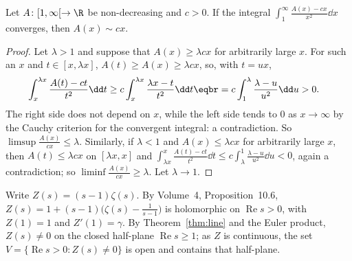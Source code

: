 \begin{lemma}\label{lem:monotone}
Let $A\colon[1,\infty[\to\R$ be non-decreasing and $c>0$. If the integral $\displaystyle\int_1^\infty\frac{A(x)-cx}{x^2}\dd x$ converges, then $A(x)\sim cx$.
\end{lemma}
\begin{proof}
Let $\lambda>1$ and suppose that $A(x)\ge\lambda cx$ for arbitrarily large $x$. For such an $x$ and $t\in[x,\lambda x]$, $A(t)\ge A(x)\ge\lambda cx$, so, with $t=ux$,
\[
\begin{aligned}\int_x^{\lambda x}\frac{A(t)-ct}{t^2}\dd t&\ge c\int_x^{\lambda x}\frac{\lambda x-t}{t^2}\dd t\eqbr=c\int_1^\lambda\frac{\lambda-u}{u^2}\dd u>0.\end{aligned}
\]
The right side does not depend on $x$, while the left side tends to $0$ as $x\to\infty$ by the Cauchy criterion for the convergent integral: a contradiction. So
$\limsup\frac{A(x)}{cx}\le\lambda$. Similarly, if $\lambda<1$ and $A(x)\le\lambda cx$ for arbitrarily large $x$, then $A(t)\le\lambda cx$ on $[\lambda x,x]$ and
$\int_{\lambda x}^x\frac{A(t)-ct}{t^2}\dd t\le c\int_\lambda^1\frac{\lambda-u}{u^2}\dd u<0$, again a contradiction; so $\liminf\frac{A(x)}{cx}\ge\lambda$. Let $\lambda\to1$.
\end{proof}

Write $Z(s)=(s-1)\zeta(s)$. By Volume~4, Proposition~10.6, $Z(s)=1+(s-1)\bigl(\zeta(s)-\frac1{s-1}\bigr)$ is holomorphic on $\operatorname{Re}s>0$, with $Z(1)=1$ and $Z'(1)=\gamma$. By
Theorem~\ref{thm:line} and the Euler product, $Z(s)\ne0$ on the closed half-plane $\operatorname{Re}s\ge1$; as $Z$ is continuous, the set $V=\{\operatorname{Re}s>0:Z(s)\ne0\}$ is open and contains that half-plane.

